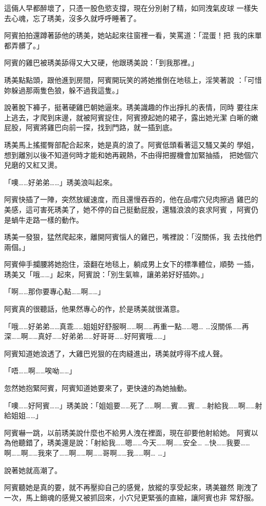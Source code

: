 這倆人早都醉壞了，只憑一股色慾支撐，現在分別射了精，如同洩氣皮球
一樣失去心魂，忘了琇美，沒多久就呼呼睡著了。

阿賓拍拍還蹲著舔他的琇美，她站起來往窗裡一看，笑罵道：「混蛋！把
我的床單都弄髒了。」

阿賓的雞巴被琇美舔得又大又硬，他跟琇美說：「到我那裡。」

琇美點點頭，跟他進到房間，阿賓開玩笑的將她推倒在地毯上，淫笑著說
：「可惜妳躲過那兩隻色狼，躲不過我這隻。」

說著脫下褲子，挺著硬雞巴朝她逼來。琇美識趣的作出掙扎的表情，同時
要往床上逃去，才爬到床邊，就被阿賓捉住，阿賓撩起她的裙子，露出她光潔
白晰的嫩屁股，阿賓將雞巴向前一探，找到門路，就一插到底。

琇美馬上搖擺臀部配合起來，她是真的浪了。阿賓低頭看著這又騷又美的
學姐，想到離別以後不知道何時才能和她再親熱，不由得把握機會加緊抽插，
把她個穴兒磨的又紅又燙。

「噢……好弟弟……」琇美浪叫起來。

阿賓快插了一陣，突然放緩速度，而且還慢吞吞的，他在品嚐穴兒肉擦過
雞巴的美感，這可害死琇美了，她不停的自己挺動屁股，還騷浪浪的哀求阿賓
，阿賓仍是蝸牛走路一樣的動作。

琇美一發狠，猛然爬起來，離開阿賓惱人的雞巴，嘴裡說：「沒關係，我
去找他們兩個。」

阿賓伸手攔腰將她抱住，滾翻在地毯上，躺成男上女下的標準體位，順勢
一插，琇美又「哦……」起來，阿賓說：「別生氣嘛，讓弟弟好好插妳。」

「啊……那你要專心點……啊……」

阿賓真的很聽話，他果然專心的作，於是琇美就很滿意。

「哦……好弟弟……真乖……姐姐好舒服啊……啊……再重一點……嗯…
…沒關係……再深……啊……真好……好弟弟……好哥哥……好阿賓哦……」

阿賓知道她浪透了，大雞巴兇狠的在肉縫進出，琇美就哼得不成人聲。

「唔……啊……唉呦……」

忽然她抱緊阿賓，阿賓知道她要來了，更快速的為她抽動。

「噢……好阿賓……」琇美說：「姐姐要……死了……啊……賓……賓…
…射給我……啊……射給姐姐……」

阿賓嚇一跳，以前琇美說什麼也不給男人洩在裡面，現在卻要他射給她。
阿賓以為他聽錯了，琇美還是說：「射給我……嗯……今天……啊……安全…
…快……我要……啊……啊……我來了……啊……啊……哥啊……我……啊…
…」

說著她就高潮了。

阿賓聽她是真的要，就不再壓抑自己的感覺，放縱的享受起來，琇美雖然
剛洩了一次，馬上銷魂的感覺又被抓回來，小穴兒更緊張的直縮，讓阿賓也非
常舒服。


